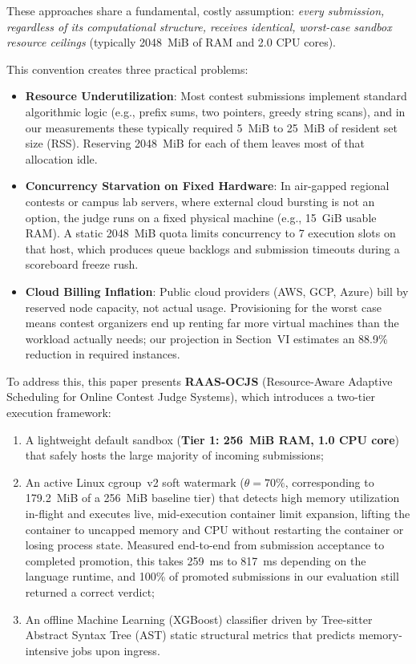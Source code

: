 \documentclass[conference]{IEEEtran}
\begin{document}
These approaches share a fundamental, costly assumption: \textit{every submission, regardless of its computational structure, receives identical, worst-case sandbox resource ceilings} (typically 2048~MiB of RAM and 2.0 CPU cores).

This convention creates three practical problems:
\begin{itemize}
    \item \textbf{Resource Underutilization}: Most contest submissions implement standard algorithmic logic (e.g., prefix sums, two pointers, greedy string scans), and in our measurements these typically required 5~MiB to 25~MiB of resident set size (RSS). Reserving 2048~MiB for each of them leaves most of that allocation idle.
    \item \textbf{Concurrency Starvation on Fixed Hardware}: In air-gapped regional contests or campus lab servers, where external cloud bursting is not an option, the judge runs on a fixed physical machine (e.g., 15~GiB usable RAM). A static 2048~MiB quota limits concurrency to 7 execution slots on that host, which produces queue backlogs and submission timeouts during a scoreboard freeze rush.
    \item \textbf{Cloud Billing Inflation}: Public cloud providers (AWS, GCP, Azure) bill by reserved node capacity, not actual usage. Provisioning for the worst case means contest organizers end up renting far more virtual machines than the workload actually needs; our projection in Section~VI estimates an 88.9\% reduction in required instances.
\end{itemize}

To address this, this paper presents \textbf{RAAS-OCJS} (Resource-Aware Adaptive Scheduling for Online Contest Judge Systems), which introduces a two-tier execution framework:
\begin{enumerate}
    \item A lightweight default sandbox (\textbf{Tier 1: 256~MiB RAM, 1.0 CPU core}) that safely hosts the large majority of incoming submissions;
    \item An active Linux cgroup~v2 soft watermark ($\theta = 70\%$, corresponding to 179.2~MiB of a 256~MiB baseline tier) that detects high memory utilization in-flight and executes live, mid-execution container limit expansion, lifting the container to uncapped memory and CPU without restarting the container or losing process state. Measured end-to-end from submission acceptance to completed promotion, this takes 259~ms to 817~ms depending on the language runtime, and 100\% of promoted submissions in our evaluation still returned a correct verdict;
    \item An offline Machine Learning (XGBoost) classifier driven by Tree-sitter Abstract Syntax Tree (AST) static structural metrics that predicts memory-intensive jobs upon ingress.
\end{enumerate}
\end{document}

